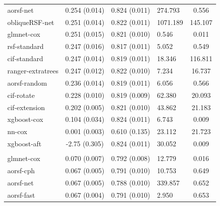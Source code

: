 \documentclass[twoside,11pt]{article}\usepackage[]{graphicx}\usepackage[]{xcolor}
\newenvironment{knitrout}{}{} %
\begin{document}
\begin{knitrout}
\begin{longtable}[t]{lcclc}
\hspace{1em}aorsf-net & 0.254 (0.014) & 0.824 (0.011) & 274.793 & 0.556\\
\hspace{1em}obliqueRSF-net & 0.251 (0.014) & 0.822 (0.011) & 1071.189 & 145.107\\
\hspace{1em}glmnet-cox & 0.251 (0.015) & 0.821 (0.010) & 0.546 & 0.011\\
\hspace{1em}rsf-standard & 0.247 (0.016) & 0.817 (0.011) & 5.052 & 0.549\\
\hspace{1em}cif-standard & 0.247 (0.014) & 0.819 (0.011) & 18.346 & 116.811\\
\hspace{1em}ranger-extratrees & 0.247 (0.012) & 0.822 (0.010) & 7.234 & 16.737\\
\hspace{1em}aorsf-random & 0.236 (0.014) & 0.819 (0.011) & 6.056 & 0.566\\
\hspace{1em}cif-rotate & 0.228 (0.010) & 0.819 (0.009) & 62.380 & 20.093\\
\hspace{1em}cif-extension & 0.202 (0.005) & 0.821 (0.010) & 43.862 & 21.183\\
\hspace{1em}xgboost-cox & 0.104 (0.034) & 0.824 (0.011) & 6.743 & 0.009\\
\hspace{1em}nn-cox & 0.001 (0.003) & 0.610 (0.135) & 23.112 & 21.723\\
\hspace{1em}xgboost-aft & -2.75 (0.305) & 0.824 (0.011) & 30.052 & 0.009\\
\addlinespace[0.3em]
\hline
\multicolumn{5}{l}{\textit{\textbf{SPRINT; CVD death, n = 9361, p = 174}}}\\
\hline
\hspace{1em}glmnet-cox & 0.070 (0.007) & 0.792 (0.008) & 12.779 & 0.016\\
\hspace{1em}aorsf-cph & 0.067 (0.005) & 0.791 (0.010) & 10.753 & 0.649\\
\hspace{1em}aorsf-net & 0.067 (0.005) & 0.788 (0.010) & 339.857 & 0.652\\
\hspace{1em}aorsf-fast & 0.067 (0.004) & 0.791 (0.010) & 2.950 & 0.653\\

\end{longtable}
\end{knitrout}
\end{document}
